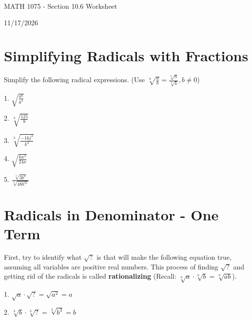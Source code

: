 \documentclass[12pt]{article}
\begin{document}
\begin{center}
    {\LARGE MATH 1075 - Section 10.6 Worksheet}

    \vspace{2em}

    {\large 11/17/2026}
\end{center}
\section{Simplifying Radicals with Fractions}
Simplify the following radical expressions. (Use $\sqrt[n]{\frac{a}{b}}=\frac{\sqrt[n]{a}}{\sqrt[n]{b}}, b\neq  0 $)

\vspace{1.5em}

1. $\sqrt{\frac{a^{6}}{b^{4}} }$

\vspace{4.5em} 

2. $\sqrt[3]{\frac{125}{8} }$

\vspace{4.5em} 

3. $\sqrt[3]{\frac{-16j^{3}}{k^{3}} }$

\vspace{4.5em} 

4. $\sqrt{\frac{6x^{3}}{24x} }$

\vspace{4.5em}

5. $\frac{\sqrt[4]{3b^{3}}}{\sqrt[4]{48b^{11}}} $ 

\vspace{4.5em}

\section{Radicals in Denominator - One Term} 
First, try to identify what $\sqrt{?}$ is that will make the following equation true, assuming all variables are positive real numbers. This process of finding $\sqrt{?}$ and getting rid of the radicals is called \textbf{rationalizing} (Recall: $\sqrt[n]{a}\cdot\sqrt[n]{b}=\sqrt[n]{ab}$).

\vspace{1.5em} 

1. $\sqrt{a}\cdot \sqrt{?}=\sqrt{a^{2}}=a$ 

\vspace{4.5em} 

2. $\sqrt[3]{b}\cdot \sqrt[3]{?}=\sqrt[3]{b^{3}}=b$ 

\vspace{4.5em} 
\end{document}
